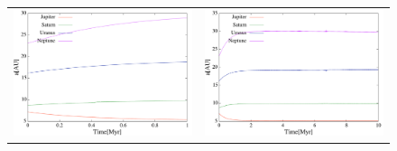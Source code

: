 \documentclass[11pt,a4paper,oneside,onecolumn]{jarticle}
\begin{document}
\begin{figure}[H]
\begin{tabular}{cc}
\begin{minipage}[t]{0.45\hsize}
\centering
\includegraphics[width=7.6cm]{./image/move500kyr_a_1Myr.pdf}
\end{minipage} &
\begin{minipage}[t]{0.45\hsize}
\centering
\includegraphics[width=7.6cm]{./image/move500kyr_a_10Myr.pdf}
\end{minipage}
%
\end{tabular}
\caption{\label{}}
\end{figure}
\end{document}

